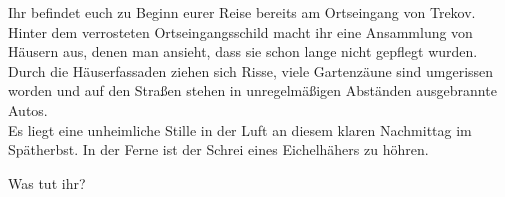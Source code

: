 Ihr befindet euch zu Beginn eurer Reise bereits am Ortseingang von Trekov. Hinter dem verrosteten Ortseingangsschild macht ihr eine Ansammlung von Häusern aus, denen man ansieht, dass sie schon lange nicht gepflegt wurden.
\\Durch die Häuserfassaden ziehen sich Risse, viele Gartenzäune sind umgerissen worden und auf den Straßen stehen in unregelmäßigen Abständen ausgebrannte Autos.
\\Es liegt eine unheimliche Stille in der Luft an diesem klaren Nachmittag im Spätherbst. In der Ferne ist der Schrei eines Eichelhähers zu höhren.

Was tut ihr?

